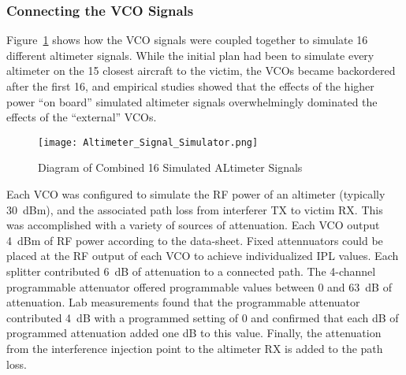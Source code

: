 \subsubsection{Connecting the VCO Signals}
Figure~\ref{fig:VCO_Coupler} shows how the VCO signals were coupled together to simulate 16 different altimeter signals. While the initial plan had been to simulate every altimeter on the 15 closest aircraft to the victim, the VCOs became backordered after the first 16, and empirical studies showed that the effects of the higher power ``on board'' simulated altimeter signals overwhelmingly dominated the effects of the ``external'' VCOs. 
\begin{figure}[ht]
\centering
\texttt{[image: Altimeter\_Signal\_Simulator.png]}
\caption{Diagram of Combined 16 Simulated ALtimeter Signals}

\label{fig:VCO_Coupler}

\end{figure}
Each VCO was configured to simulate the RF power of an altimeter (typically 30~dBm), and the associated path loss from interferer TX to victim RX. This was accomplished with a variety of sources of attenuation. Each VCO output 4~dBm of RF power according to the data-sheet. Fixed attennuators could be placed at the RF output of each VCO to achieve individualized IPL values. Each splitter contributed 6~dB of attenuation to a connected path. The 4-channel programmable attenuator offered programmable values between 0 and 63~dB of attenuation. Lab measurements found that the programmable attenuator contributed 4~dB with a programmed setting of 0 and confirmed that each dB of programmed attenuation added one dB to this value. Finally, the attenuation from the interference injection point to the altimeter RX is added to the path loss. 

